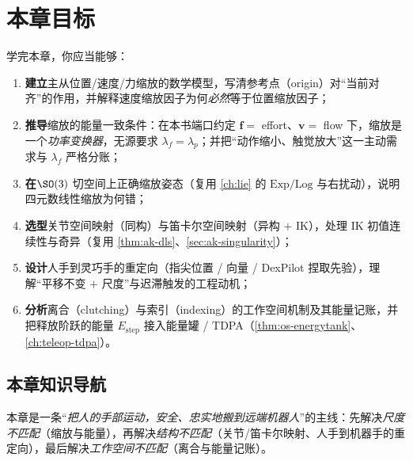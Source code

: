 \section*{本章目标}
学完本章，你应当能够：
\begin{enumerate}
  \item \textbf{建立}主从位置/速度/力缩放的数学模型，写清参考点（origin）对“当前对齐”的作用，并解释速度缩放因子为何\emph{必然}等于位置缩放因子；
  \item \textbf{推导}缩放的能量一致条件：在本书端口约定 $\mathbf{f}=$ effort、$\mathbf{v}=$ flow 下，缩放是一个\emph{功率变换器}，无源要求 $\lambda_f=\lambda_p$；并把“动作缩小、触觉放大”这一主动需求与 $\lambda_f$ 严格分账；
  \item \textbf{在}$\SO(3)$ 切空间上正确缩放姿态（复用 \cref{ch:lie} 的 $\mathrm{Exp}/\mathrm{Log}$ 与右扰动），说明四元数线性缩放为何错；
  \item \textbf{选型}关节空间映射（同构）与笛卡尔空间映射（异构 $+$ IK），处理 IK 初值连续性与奇异（复用 \cref{thm:ak-dls}、\cref{sec:ak-singularity}）；
  \item \textbf{设计}人手到灵巧手的重定向（指尖位置 / 向量 / DexPilot 捏取先验），理解“平移不变 $+$ 尺度”与迟滞触发的工程动机；
  \item \textbf{分析}离合（clutching）与索引（indexing）的工作空间机制及其能量记账，并把释放阶跃的能量 $E_{\text{step}}$ 接入能量罐 / TDPA（\cref{thm:os-energytank}、\cref{ch:teleop-tdpa}）。
\end{enumerate}

\subsection*{本章知识导航}
本章是一条“\emph{把人的手部运动，安全、忠实地搬到远端机器人}”的主线：先解决\emph{尺度不匹配}（缩放与能量），再解决\emph{结构不匹配}（关节/笛卡尔映射、人手到机器手的重定向），最后解决\emph{工作空间不匹配}（离合与能量记账）。

